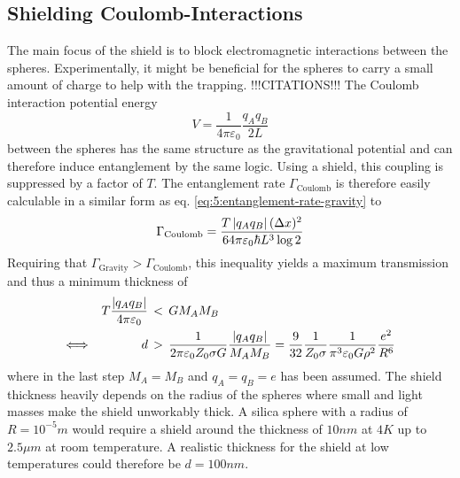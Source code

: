 \subsection{Shielding Coulomb-Interactions}
The main focus of the shield is to block electromagnetic interactions between the spheres.
Experimentally, it might be beneficial for the spheres to carry a small amount of charge to help with the trapping. !!!CITATIONS!!!
The Coulomb interaction potential energy
\begin{equation}
  V = \frac{1}{4\pi\varepsilon_0} \frac{q_A q_B}{2L}
\end{equation}
between the spheres has the same structure as the gravitational potential and can therefore induce entanglement by the same logic.
Using a shield, this coupling is suppressed by a factor of $T$.
The entanglement rate $\Gamma_\mathrm{Coulomb}$ is therefore easily calculable in a similar form as eq. \eqref{eq:5:entanglement-rate-gravity} to
\begin{equation}\label{eq:5:entanglement-rate-coulomb}
  \Gamma_\mathrm{Coulomb} = \frac{T \left\lvert q_A q_B\right\rvert (\Delta x)^2}{64 \pi \varepsilon_0 \hbar L^3 \log 2}
\end{equation}
Requiring that $\Gamma_\mathrm{Gravity} > \Gamma_\mathrm{Coulomb}$, this inequality yields a maximum transmission and thus a minimum thickness of
\begin{align}\label{eq:5:coulomb-gravity-condition}
  T \frac{\left\lvert q_A q_B\right\rvert}{4 \pi \varepsilon_0} \, &< \, G M_A M_B \\
  \Longleftrightarrow \quad\quad\quad\quad d \, &> \, \frac{1}{2 \pi \varepsilon_0 Z_0 \sigma G} \frac{\left\lvert q_A q_B\right\rvert}{M_A M_B} = \frac{9}{32}\frac{1}{Z_0 \sigma} \frac{1}{\pi^3 \varepsilon_0 G \rho^2} \frac{e^2}{R^6}
\end{align}
where in the last step $M_A = M_B$ and $q_A = q_B = e$ has been assumed.
The shield thickness heavily depends on the radius of the spheres where small and light masses make the shield unworkably thick.
A silica sphere with a radius of $R=10^{-5}\si{m}$ would require a shield around the thickness of $10\si{nm}$ at $4\si{K}$ up to $2.5\si{\mu m}$ at room temperature.
A realistic thickness for the shield at low temperatures could therefore be $d=100\si{nm}$.

